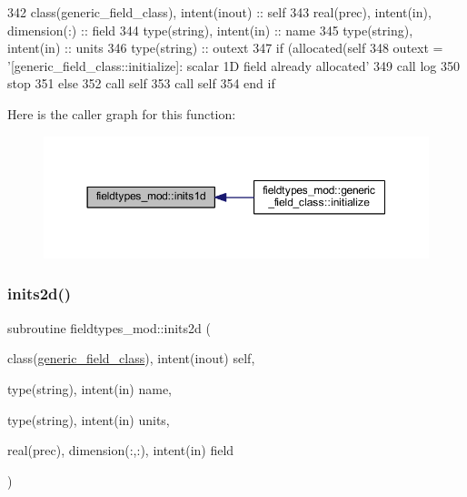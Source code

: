\begin{DoxyCode}
342     \textcolor{keywordtype}{class}(generic\_field\_class), \textcolor{keywordtype}{intent(inout)} :: self
343     \textcolor{keywordtype}{real(prec)}, \textcolor{keywordtype}{intent(in)}, \textcolor{keywordtype}{dimension(:)} :: field
344     \textcolor{keywordtype}{type}(string), \textcolor{keywordtype}{intent(in)} :: name
345     \textcolor{keywordtype}{type}(string), \textcolor{keywordtype}{intent(in)} :: units
346     \textcolor{keywordtype}{type}(string) :: outext
347     \textcolor{keywordflow}{if} (\textcolor{keyword}{allocated}(self%
348         outext = \textcolor{stringliteral}{'[generic\_field\_class::initialize]: scalar 1D field already allocated'}
349         \textcolor{keyword}{call }log%
350         stop
351     \textcolor{keywordflow}{else}
352         \textcolor{keyword}{call }self%
353         \textcolor{keyword}{call }self%
354 \textcolor{keywordflow}{    end if}
\end{DoxyCode}
Here is the caller graph for this function\+:\nopagebreak
\begin{figure}[H]
\begin{center}
\leavevmode
\includegraphics[width=350pt]{namespacefieldtypes__mod_a3f1571ad15733a3f2fff43e35f309416_icgraph}
\end{center}
\end{figure}
\mbox{\label{namespacefieldtypes__mod_ad3329e97ec60bf9226d19be45ed21859}} 
\subsubsection{\texorpdfstring{inits2d()}{inits2d()}}
{\footnotesize\ttfamily subroutine fieldtypes\+\_\+mod\+::inits2d (\begin{DoxyParamCaption}\item[{class(\mbox{\hyperlink{structfieldtypes__mod_1_1generic__field__class}{generic\+\_\+field\+\_\+class}}), intent(inout)}]{self,  }\item[{type(string), intent(in)}]{name,  }\item[{type(string), intent(in)}]{units,  }\item[{real(prec), dimension(\+:,\+:), intent(in)}]{field }\end{DoxyParamCaption})\hspace{0.3cm}{\ttfamily [private]}}



